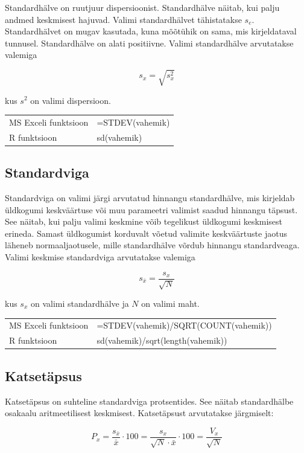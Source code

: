 \documentclass[
]{book}
\theoremstyle{definition}
\theoremstyle{definition}
\theoremstyle{definition}
\theoremstyle{definition}
\theoremstyle{remark}
\begin{document}
Standardhälve on ruutjuur dispersioonist. Standardhälve näitab, kui palju andmed keskmisest hajuvad. Valimi standardhälvet tähistatakse \(s_e\). Standardhälvet on mugav kasutada, kuna mõõtühik on sama, mis kirjeldataval tunnusel. Standardhälve on alati positiivne. Valimi standardhälve arvutatakse valemiga

\[s_x = \sqrt{s_x^2}\]

kus \(s^2\) on valimi dispersioon.

\begin{tabular}{ll}
MS Exceli funktsioon & =STDEV(vahemik)\\
R funktsioon & sd(vahemik) \\
\end{tabular}

\subsection{Standardviga}\label{standardviga}

Standardviga on valimi järgi arvutatud hinnangu standardhälve, mis kirjeldab üldkogumi keskväärtuse või muu parameetri valimist saadud hinnangu täpsust. See näitab, kui palju valimi keskmine võib tegelikust üldkogumi keskmisest erineda. Samast üldkogumist korduvalt võetud valimite keskväärtuste jaotus läheneb normaaljaotusele, mille standardhälve võrdub hinnangu standardveaga. Valimi keskmise standardviga arvutatakse valemiga

\[
s_{\bar{x}} = \frac{s_x}{\sqrt{N}}
\]

kus \(s_x\) on valimi standardhälve ja \(N\) on valimi maht.

\begin{tabular}{ll}
MS Exceli funktsioon & =STDEV(vahemik)/SQRT(COUNT(vahemik))\\
R funktsioon & sd(vahemik)/sqrt(length(vahemik)) \\
\end{tabular}

\subsection{Katsetäpsus}\label{katsetuxe4psus}

Katsetäpsus on suhteline standardviga protsentides. See näitab standardhälbe osakaalu aritmeetilisest keskmisest. Katsetäpsust arvutatakse järgmiselt:

\[
P_x 
= \frac{s_{\bar{x}}}{\bar{x}} \cdot 100 
= \frac{s_x}{\sqrt{N} \cdot \bar{x}} \cdot 100 
= \frac{V_x}{\sqrt{N}}
\]
\end{document}
